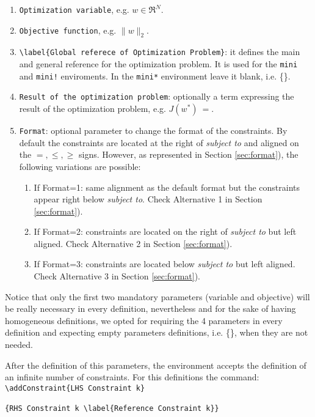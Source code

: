 \documentclass[]{report}
\begin{document}
\begin{enumerate}
	\item \verb|Optimization variable|, e.g. $w \in \Re^N$.
	\item \verb|Objective function|, e.g. $\|w\|_2$.
	\item \verb|\label{Global referece of Optimization Problem}|: it defines the main and general reference for the optimization problem. It is used for the \verb|mini| and \verb|mini!| enviroments. In the \verb|mini*| environment leave it blank, i.e. \{\}.   
	\item \verb|Result of the optimization problem|: optionally a term expressing the result of the optimization problem, e.g. $J(w^*)~=$.
	\item \verb|Format|: optional parameter to change the format of the constraints. By default the constraints are located at the right of \textit{subject to} and aligned on the $=,\leq,\geq$ signs. However, as represented in Section \ref{sec:format}), the following variations are possible:
	\begin{enumerate}
		\item If Format=1: same alignment as the default format but the constraints appear right below \textit{subject to}. Check  Alternative 1 in Section \ref{sec:format}).
		\item If Format=2: constraints are located on the right of \textit{subject to} but left aligned. Check  Alternative 2 in Section \ref{sec:format}).
		\item If Format=3: constraints are located below \textit{subject to} but left aligned. Check  Alternative 3 in Section \ref{sec:format}).
	\end{enumerate}

\end{enumerate}

\noindent Notice that only the first two mandatory parameters (variable and objective) will be really necessary in every definition, nevertheless and for the sake of having homogeneous definitions, we opted for requiring the 4 parameters in every definition and expecting empty parameters definitions, i.e. \{\}, when they are not needed.


After the definition of this parameters, the environment accepts the definition of an infinite number of constraints. For this definitions the command:
~\\

\verb|\addConstraint{LHS Constraint k}|

\verb|{RHS Constraint k \label{Reference Constraint k}}| 
~\\
\end{document}
